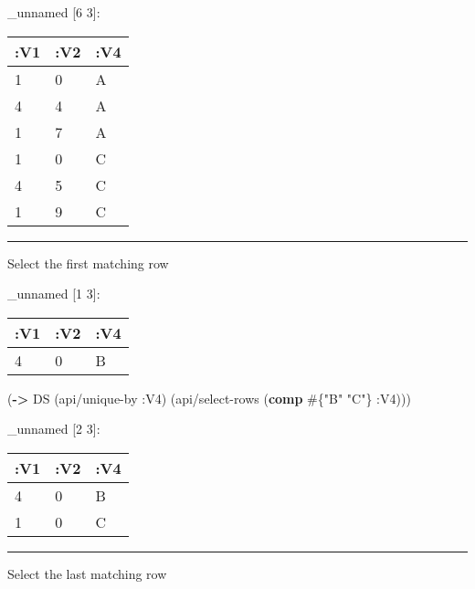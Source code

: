 \documentclass[]{article}
\newenvironment{Shaded}{\begin{snugshade}}{\end{snugshade}}
\newcommand{\AttributeTok}[1]{\textcolor[rgb]{0.77,0.63,0.00}{#1}}
\newcommand{\KeywordTok}[1]{\textcolor[rgb]{0.13,0.29,0.53}{\textbf{#1}}}
\newcommand{\NormalTok}[1]{#1}
\newcommand{\StringTok}[1]{\textcolor[rgb]{0.31,0.60,0.02}{#1}}
\newcommand{\VariableTok}[1]{\textcolor[rgb]{0.00,0.00,0.00}{#1}}
\begin{document}
\_unnamed {[}6 3{]}:

\begin{longtable}[]{@{}lll@{}}
\toprule
:V1 & :V2 & :V4\tabularnewline
\midrule
\endhead
1 & 0 & A\tabularnewline
4 & 4 & A\tabularnewline
1 & 7 & A\tabularnewline
1 & 0 & C\tabularnewline
4 & 5 & C\tabularnewline
1 & 9 & C\tabularnewline
\bottomrule
\end{longtable}

\begin{center}\rule{0.5\linewidth}{0.5pt}\end{center}

Select the first matching row

\begin{Shaded}
\end{Shaded}

\_unnamed {[}1 3{]}:

\begin{longtable}[]{@{}lll@{}}
\toprule
:V1 & :V2 & :V4\tabularnewline
\midrule
\endhead
4 & 0 & B\tabularnewline
\bottomrule
\end{longtable}

\begin{Shaded}
\begin{Highlighting}[]
\NormalTok{(}\KeywordTok{->}\NormalTok{ DS}
\NormalTok{    (api/unique-by }\AttributeTok{:V4}\NormalTok{)}
\NormalTok{    (api/select-rows (}\KeywordTok{comp}\NormalTok{ #\{}\StringTok{"B"} \StringTok{"C"}\NormalTok{\} }\AttributeTok{:V4}\NormalTok{)))}
\end{Highlighting}
\end{Shaded}

\_unnamed {[}2 3{]}:

\begin{longtable}[]{@{}lll@{}}
\toprule
:V1 & :V2 & :V4\tabularnewline
\midrule
\endhead
4 & 0 & B\tabularnewline
1 & 0 & C\tabularnewline
\bottomrule
\end{longtable}

\begin{center}\rule{0.5\linewidth}{0.5pt}\end{center}

Select the last matching row
\end{document}
